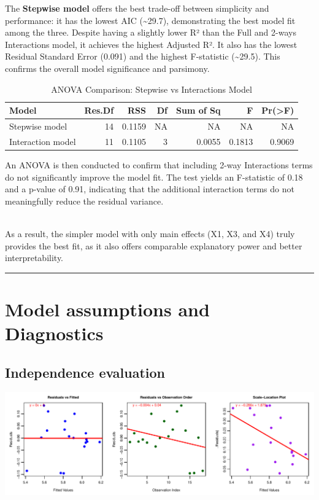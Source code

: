 \documentclass[
  11pt,
]{article}
\begin{document}
The \textbf{Stepwise model} offers the best trade-off between simplicity
and performance: it has the lowest AIC (\textasciitilde29.7),
demonstrating the best model fit among the three. Despite having a
slightly lower R² than the Full and 2-ways Interactions model, it
achieves the highest Adjusted R². It also has the lowest Residual
Standard Error (0.091) and the highest F-statistic
(\textasciitilde29.5). This confirms the overall model significance and
parsimony.

\begin{table}[!h]
\centering
\caption{\label{tab:unnamed-chunk-18}ANOVA Comparison: Stepwise vs Interactions Model}
\centering
\fontsize{8}{10}\selectfont
\begin{tabular}[t]{lrrrrrr}
\toprule
Model & Res.Df & RSS & Df & Sum of Sq & F & Pr(>F)\\
\midrule
Stepwise model & 14 & 0.1159 & NA & NA & NA & NA\\
Interaction model & 11 & 0.1105 & 3 & 0.0055 & 0.1813 & 0.9069\\
\bottomrule
\end{tabular}
\end{table}

An ANOVA is then conducted to confirm that including 2-way Interactions
terms do not significantly improve the model fit. The test yields an
F-statistic of 0.18 and a p-value of 0.91, indicating that the
additional interaction terms do not meaningfully reduce the residual
variance.\\
\strut \\
As a result, the simpler model with only main effects (X1, X3, and X4)
truly provides the best fit, as it also offers comparable explanatory
power and better interpretability.

\begin{center}\rule{0.5\linewidth}{0.5pt}\end{center}

\section{Model assumptions and
Diagnostics}\label{model-assumptions-and-diagnostics}

\subsection{Independence evaluation}\label{independence-evaluation}

\includegraphics{Figs/unnamed-chunk-19-1.pdf}
\end{document}
